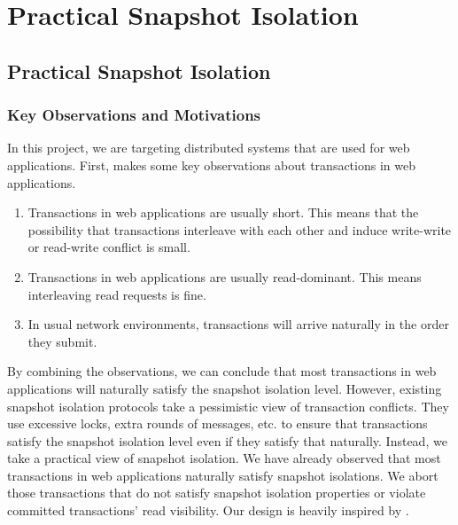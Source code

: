 \chapter{Practical Snapshot Isolation}
\section{Practical Snapshot Isolation}


\subsection{Key Observations and Motivations}
In this project, we are targeting distributed systems that 
are used for web applications. 
First, \cite{lu2023ncc} makes some key observations about transactions in web applications.

\begin{enumerate}
    \item Transactions in web applications are usually short. This means that the possibility that transactions interleave with each other and induce write-write or read-write conflict is small.
    \item Transactions in web applications are usually read-dominant. This means interleaving read requests  is fine.
    \item In usual network environments, transactions will arrive naturally in the order they submit.
\end{enumerate}

By combining the observations, we can conclude that most transactions in web applications will naturally satisfy the snapshot isolation level.  However, existing snapshot isolation protocols take a pessimistic view of transaction conflicts. They use excessive locks, extra rounds of messages, etc. to ensure that transactions satisfy the snapshot isolation level even if they satisfy that naturally. Instead, we take a practical view of snapshot isolation. We have already observed that most transactions in web applications naturally satisfy snapshot isolations. We abort those transactions that do not satisfy snapshot isolation properties or violate committed transactions' read visibility. Our design is heavily inspired by \cite{lu2023ncc}.


